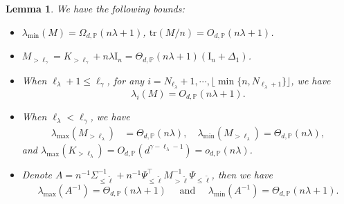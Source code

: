 \documentclass{article}
\theoremstyle{plain}
\newtheorem{lemma}[theorem]{Lemma}
\theoremstyle{definition}
\theoremstyle{remark}
\newcommand{\dhnote}[1]{{\color{red}[#1]} } %
\begin{document}
\begin{appendix}
\begin{lemma}\label{lemma lambda max min}
We have the following bounds:
\begin{itemize}
    \item[(i)] $\lambda_{\text{min}}\left( M\right) = \Omega_{d, \mathbb{P}}(n\lambda+1)$, 
$\mathrm{tr}(M / n)=O_{d, \mathbb{P}}(n\lambda+1)$.

    \item[(ii)] $M_{>\ell_{\gamma}} = K_{>\ell_{\gamma}} + n\lambda \mathrm{I}_n = \Theta_{d, \mathbb{P}}(n\lambda + 1) \left(\mathrm{I}_{n} + \Delta_{1}\right)$.

    \item[(iii)] 
    When $\ell_{\lambda}+1 \leq \ell_{\gamma}$, for any $i=N_{\ell_{\lambda}}+1, \cdots, \lfloor\min\{n, N_{\ell_{\lambda}+1}\}\rfloor$,
    we have
        $$
        \lambda_i(M) = O_{d, \mathbb{P}}(n\lambda + 1).
        $$
    

    \item[(iv)] When $\ell_{\lambda}<\ell_{\gamma}$, we have %
    \begin{align*}
        \lambda_{\text{max}}(M_{>\ell_{\lambda}}) &= \Theta_{d, \mathbb{P}}(n\lambda),
        \quad
        \lambda_{\text{min}}(M_{>\ell_{\lambda}}) = \Theta_{d, \mathbb{P}}(n\lambda),
    \end{align*}
    and $\lambda_{\text{max}}(K_{>\ell_{\lambda}}) =
 O_{d, \mathbb{P}}\left({d^{\gamma-\ell_{\lambda}-1}}\right) =  
    o_{d, \mathbb{P}}(n\lambda)$.

    \item[(v)] Denote $A = n^{-1}\Sigma_{\leq \tilde{\ell}}^{-1} + n^{-1}\Psi_{\leq \tilde{\ell}}^{\top} M_{>\tilde{\ell}}^{-1} \Psi_{\leq \tilde{\ell}}$, then we have
    \begin{displaymath}
        \lambda_{\text{max}} \left(  A^{-1} \right)
        = \Theta_{d, \mathbb{P}}(n\lambda + 1)
        \quad \text{ and } \quad
        \lambda_{\text{min}} \left(  A^{-1} \right) = \Theta_{d, \mathbb{P}}(n\lambda + 1).
    \end{displaymath}


\end{itemize}
\end{lemma}
\end{appendix}
\end{document}
